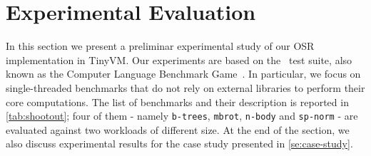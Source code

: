 
\section{Experimental Evaluation}
\label{se:experiments}

In this section we present a preliminar experimental study of our OSR implementation in TinyVM. Our experiments are based on the \shootout\ test suite, also known as the Computer Language Benchmark Game~\cite{shootout}. In particular, we focus on single-threaded benchmarks that do not rely on external libraries to perform their core computations.
The list of benchmarks and their description is reported in \mytable\ref{tab:shootout}; four of them - namely {\tt b-trees}, {\tt mbrot}, {\tt n-body} and {\tt sp-norm} - are evaluated against two workloads of different size.
At the end of the section, we also discuss experimental results for the case study presented in \mysection\ref{se:case-study}.

